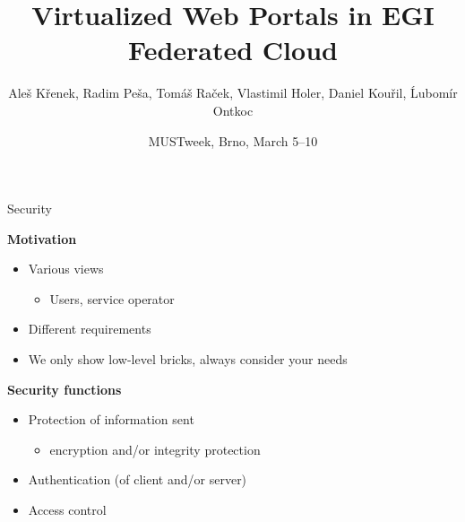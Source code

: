 \documentclass[smaller,t]{beamer}
\def\nadpis#1{\par\medskip\textbf{#1}}
\begin{document}
\makeatletter

\title{Virtualized Web Portals in EGI \\[\smallskipamount] Federated Cloud}
\date{MUSTweek, Brno, March 5--10}
\author[A. Křenek et al.]{Aleš Křenek, Radim Peša, Tomáš Raček, Vlastimil Holer, Daniel Kouřil, Ĺubomír Ontkoc}
\begin{frame}
\maketitle
\end{frame}

\begin{frame}{Security}

\nadpis{Motivation}
\begin{itemize}
\item Various views
\begin{itemize}
\item Users, service operator
\end{itemize}
\item Different requirements
\item We only show low-level bricks, always consider your needs
\end{itemize}

\nadpis{Security functions}
\begin{itemize}
\item Protection of information sent
\begin{itemize}
\item encryption and/or integrity protection
\end{itemize}
\item Authentication (of client and/or server)
\item Access control
\end{itemize}

\end{frame}
\end{document}
